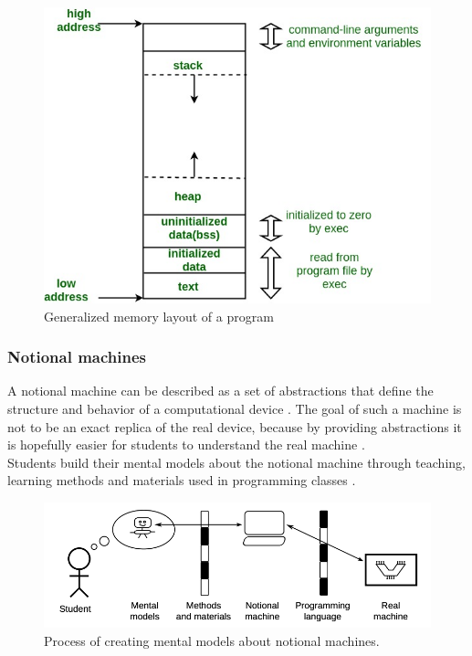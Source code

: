 \documentclass[]{usiinfbachelorproject}
\begin{document}
\begin{figure}[h!]
\includegraphics[scale=0.4]{figures/memory_layout.jpg}
\centering
\caption {Generalized memory layout of a program}
\end{figure}
 
\subsubsection{Notional machines}

A notional machine can be described as a set of abstractions that define the structure and behavior of a computational device \cite{guzdial_et_al:DR:2019:11627}. The goal of such a machine is not to be an exact replica of the real device, because by providing abstractions it is hopefully easier for students to understand the real machine \cite{7743153}.\\
\noindent Students build their mental models about the notional machine through teaching, learning methods and materials used in programming classes \cite{HIDALGO-CESPEDES2016}.
 
\begin{figure}[h!]
\includegraphics[scale=0.8]{figures/notional_machine.png}
\centering
\caption {Process of creating mental models about notional machines.}
\end{figure}
 
\end{document}
